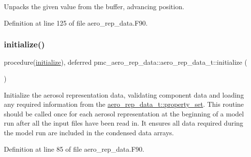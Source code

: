 Unpacks the given value from the buffer, advancing position. 



Definition at line 125 of file aero\+\_\+rep\+\_\+data.\+F90.

\mbox{\label{structpmc__aero__rep__data_1_1aero__rep__data__t_aa02828c1308ce18b054cfdc01d3ce997}} 
\subsubsection{\texorpdfstring{initialize()}{initialize()}}
{\footnotesize\ttfamily procedure(\mbox{\hyperlink{interfacepmc__aero__rep__data_1_1initialize}{initialize}}), deferred pmc\+\_\+aero\+\_\+rep\+\_\+data\+::aero\+\_\+rep\+\_\+data\+\_\+t\+::initialize (\begin{DoxyParamCaption}{ }\end{DoxyParamCaption})\hspace{0.3cm}{\ttfamily [private]}}



Initialize the aerosol representation data, validating component data and loading any required information from the {\ttfamily \mbox{\hyperlink{structpmc__aero__rep__data_1_1aero__rep__data__t_a87b1bf5cd10a0a2b51390fb24ebf56c5}{aero\+\_\+rep\+\_\+data\+\_\+t\+::property\+\_\+set}}}. This routine should be called once for each aerosol representation at the beginning of a model run after all the input files have been read in. It ensures all data required during the model run are included in the condensed data arrays. 



Definition at line 85 of file aero\+\_\+rep\+\_\+data.\+F90.

\mbox{\label{structpmc__aero__rep__data_1_1aero__rep__data__t_a4c05bf62e74f1aa5ae8b59071e048fce}} 
